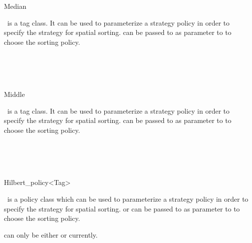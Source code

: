 \begin{ccRefClass}{Median}

\ccDefinition
\ccRefName\ is a tag class.  It can be used to parameterize a strategy policy
in order to specify the strategy for spatial sorting.
 can be passed to   
as parameter to
 to choose the sorting policy.


\ccIsModel
{}

\ccSeeAlso
{} \\
 \\
 \\

\end{ccRefClass} 


\begin{ccRefClass}{Middle}

\ccDefinition
\ccRefName\ is a tag class.  It can be used to parameterize a strategy policy
in order to specify the strategy for spatial sorting.
 can be passed to   
as parameter to
 to choose the sorting policy.


\ccIsModel
{}


\ccSeeAlso
{} \\
 \\
 \\

\end{ccRefClass} 


\begin{ccRefClass}{Hilbert_policy<Tag>}

\ccDefinition
\ccRefName\ is a policy class which can be used to parameterize a strategy policy
in order to specify the strategy for spatial sorting.
or
can be passed to   
as parameter to
 to choose the sorting policy.




\ccParameters

 can only be either  or  currently.

\ccIsModel
{}

\ccSeeAlso
{} \\
 \\
 \\

\end{ccRefClass} 


